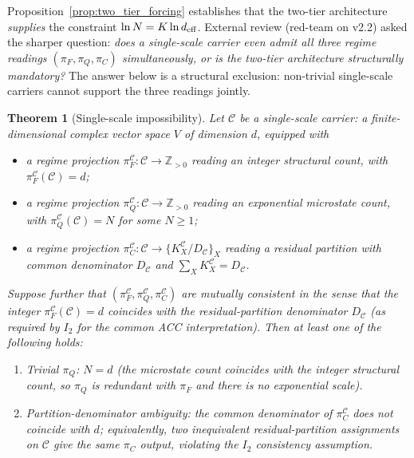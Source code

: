 \documentclass[11pt]{article}
\theoremstyle{plain}
\newtheorem{theorem}{Theorem}[section]
\theoremstyle{definition}
\theoremstyle{remark}
\begin{document}
\noindent Proposition~\ref{prop:two_tier_forcing} establishes that the two-tier architecture \emph{supplies} the constraint $\ln N = K \ln d_{\rm eff}$.  External review (red-team on v2.2) asked the sharper question: \emph{does a single-scale carrier even admit all three regime readings $(\pi_F, \pi_Q, \pi_C)$ simultaneously, or is the two-tier architecture structurally mandatory?}  The answer below is a structural exclusion: non-trivial single-scale carriers cannot support the three readings jointly.

\begin{theorem}[Single-scale impossibility]\label{thm:single_scale_impossibility}
Let $\mathcal{C}$ be a \emph{single-scale carrier}: a finite-dimensional complex vector space $V$ of dimension $d$, equipped with
\begin{itemize}[leftmargin=2em,itemsep=2pt]
  \item a regime projection $\pi_F^{\mathcal{C}} : \mathcal{C} \to \mathbb{Z}_{>0}$ reading an integer structural count, with $\pi_F^{\mathcal{C}}(\mathcal{C}) = d$;
  \item a regime projection $\pi_Q^{\mathcal{C}} : \mathcal{C} \to \mathbb{Z}_{>0}$ reading an exponential microstate count, with $\pi_Q^{\mathcal{C}}(\mathcal{C}) = N$ for some $N \geq 1$;
  \item a regime projection $\pi_C^{\mathcal{C}} : \mathcal{C} \to \{K_X^{\mathcal{C}}/D_{\mathcal{C}}\}_X$ reading a residual partition with common denominator $D_{\mathcal{C}}$ and $\sum_X K_X^{\mathcal{C}} = D_{\mathcal{C}}$.
\end{itemize}
Suppose further that $(\pi_F^{\mathcal{C}}, \pi_Q^{\mathcal{C}}, \pi_C^{\mathcal{C}})$ are \emph{mutually consistent} in the sense that the integer $\pi_F^{\mathcal{C}}(\mathcal{C}) = d$ coincides with the residual-partition denominator $D_{\mathcal{C}}$ (as required by $I_2$ for the common ACC interpretation).  Then at least one of the following holds:
\begin{enumerate}[leftmargin=2.5em,label=\textup{(\roman*)},itemsep=3pt]
  \item \emph{Trivial $\pi_Q$}: $N = d$ (the microstate count coincides with the integer structural count, so $\pi_Q$ is redundant with $\pi_F$ and there is no exponential scale).
  \item \emph{Partition-denominator ambiguity}: the common denominator of $\pi_C^{\mathcal{C}}$ does not coincide with $d$; equivalently, two inequivalent residual-partition assignments on $\mathcal{C}$ give the same $\pi_C$ output, violating the $I_2$ consistency assumption.

\end{enumerate}
\end{theorem}
\end{document}
